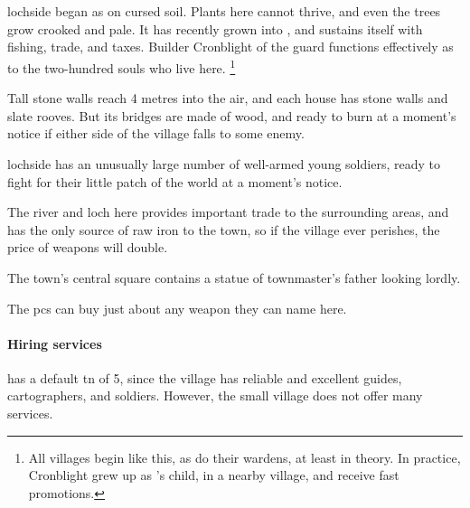 

\section[\Glsfmttext{lochside}]{~~}
\label{lochside}

\begin{multicols}{2}

\begin{exampletext}
  \Gls{lochside} began as  on cursed soil.
  Plants here cannot thrive, and even the trees grow crooked and pale.
  It has recently grown into , and sustains itself with fishing, trade, and taxes.
  Builder Cronblight of the \gls{guard} functions effectively as  to the two-hundred souls who live here.%
  \footnote{All \glspl{village} begin like this, as do their \glspl{warden}, at least in theory.
  In practice, Cronblight grew up as 's child, in a nearby \gls{village}, and receive fast promotions.}
\end{exampletext}

Tall stone walls reach 4 metres into the air, and each house has stone walls and slate rooves.
But its bridges are made of wood, and ready to burn at a moment's notice if either side of the \gls{village} falls to some enemy.

\Gls{lochside} has an unusually large number of well-armed young soldiers, ready to fight for their little patch of the world at a moment's notice.

The river and loch here provides important trade to the surrounding areas, and has the only source of raw iron to the town, so if the \gls{village} ever perishes, the price of weapons will double.


The town's central square contains a statue of \gls{townmaster}'s father looking lordly.


The \glspl{pc} can buy just about any weapon they can name here.

\paragraph{Hiring services}
has a default \gls{tn} of 5, since the \gls{village} has reliable and excellent guides, cartographers, and soldiers.
However, the small \gls{village} does not offer many services.


\end{multicols}
